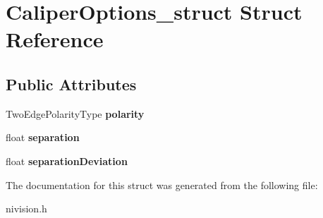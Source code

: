 \hypertarget{structCaliperOptions__struct}{\section{\-Caliper\-Options\-\_\-struct \-Struct \-Reference}
\label{structCaliperOptions__struct}
}
\subsection*{\-Public \-Attributes}
\begin{DoxyCompactItemize}
\item 
\hypertarget{structCaliperOptions__struct_a0c35e144c1657d3224c347932fe9f7d3}{\-Two\-Edge\-Polarity\-Type {\bfseries polarity}}\label{structCaliperOptions__struct_a0c35e144c1657d3224c347932fe9f7d3}

\item 
\hypertarget{structCaliperOptions__struct_a5e2a5f0664f28530b5e13bc8efc39d6d}{float {\bfseries separation}}\label{structCaliperOptions__struct_a5e2a5f0664f28530b5e13bc8efc39d6d}

\item 
\hypertarget{structCaliperOptions__struct_ab3bf247080c3d2e3b713ffdfbb169b98}{float {\bfseries separation\-Deviation}}\label{structCaliperOptions__struct_ab3bf247080c3d2e3b713ffdfbb169b98}

\end{DoxyCompactItemize}


\-The documentation for this struct was generated from the following file\-:\begin{DoxyCompactItemize}
\item 
nivision.\-h\end{DoxyCompactItemize}
